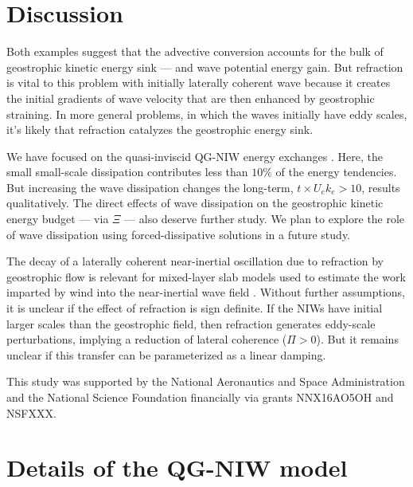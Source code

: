 \documentclass{jfm}
\begin{document}
\section{Discussion}

Both examples suggest that the advective conversion accounts for the bulk of geostrophic
kinetic energy sink --- and wave potential energy gain. But refraction is vital
to this problem with initially laterally coherent wave because it creates the
initial gradients of wave velocity that are then enhanced by geostrophic straining.
In more general problems, in which the waves initially have eddy scales, it's
likely that refraction catalyzes the geostrophic energy sink.


We have focused on the quasi-inviscid QG-NIW energy exchanges . Here, the small
small-scale dissipation contributes less than $10\%$ of the energy tendencies. But
increasing the wave dissipation changes the long-term, $t\times U_e k_e > 10$,
results qualitatively. The direct effects of wave dissipation
on the geostrophic kinetic energy budget --- via $\Xi$ --- also deserve further
study. We plan
to explore the role of wave dissipation using forced-dissipative solutions in a
future study.

The decay of a laterally coherent near-inertial oscillation due to refraction by
geostrophic flow is relevant for mixed-layer slab models used to estimate the work
imparted by wind into the near-inertial wave field \citep[e.g., ][]{alford2001}. Without further
assumptions, it is unclear if the effect of refraction is sign definite. If the
NIWs have initial larger scales than the geostrophic field, then refraction
generates eddy-scale perturbations, implying a reduction of lateral coherence
($\Pi > 0$). But it remains unclear if this transfer can be parameterized as a linear
damping.


%
%
\vspace{1.cm}
This study was supported by the National Aeronautics and Space Administration
and the National Science Foundation financially via grants NNX16AO5OH and NSFXXX.

%
%

\appendix

\section{Details of the QG-NIW model}
\end{document}
